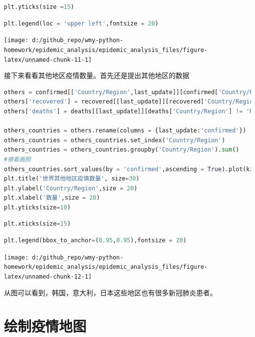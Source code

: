 \documentclass[UTF8,a4paper,12pt]{ctexart}  %
\begin{document}
\begin{lstlisting}[language=Python]
plt.yticks(size =15)
\end{lstlisting}

\begin{lstlisting}[language=Python]
plt.legend(loc = 'upper left',fontsize = 20)
\end{lstlisting}

\begin{center}\texttt{[image: d:/github\_repo/wmy-python-homework/epidemic\_analysis/epidemic\_analysis\_files/figure-latex/unnamed-chunk-11-1]} \end{center}

接下来看看其他地区疫情数量。首先还是提出其他地区的数据

\begin{lstlisting}[language=Python]
others = confirmed[['Country/Region',last_update]][confirmed['Country/Region'] != 'Mainland China']
others['recovered'] = recovered[[last_update]][recovered['Country/Region'] != 'Mainland China']
others['deaths'] = deaths[[last_update]][deaths['Country/Region'] != 'Mainland China']

others_countries = others.rename(columns = {last_update:'confirmed'})
others_countries = others_countries.set_index('Country/Region')
others_countries = others_countries.groupby('Country/Region').sum()
#接着画图
others_countries.sort_values(by = 'confirmed',ascending = True).plot(kind='barh',figsize=(20,30),color = ['red','blue','lime'], width=1,rot=2)
plt.title('世界其他地区疫情数量', size=30)
plt.ylabel('Country/Region',size = 20)
plt.xlabel('数量',size = 20)
plt.yticks(size=10)
\end{lstlisting}

\begin{lstlisting}[language=Python]
plt.xticks(size=15)
\end{lstlisting}

\begin{lstlisting}[language=Python]
plt.legend(bbox_to_anchor=(0.95,0.95),fontsize = 20)
\end{lstlisting}

\begin{center}\texttt{[image: d:/github\_repo/wmy-python-homework/epidemic\_analysis/epidemic\_analysis\_files/figure-latex/unnamed-chunk-12-1]} \end{center}

从图可以看到，韩国，意大利，日本这些地区也有很多新冠肺炎患者。

\section{绘制疫情地图}
\end{document}
